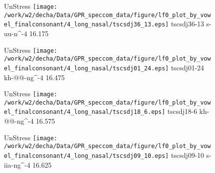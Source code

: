 \documentclass{article}
\begin{document}
\begin{figure}[t]
\begin{minipage}[b]{.24\textwidth}
UnStress
\centering
\texttt{[image: /work/w2/decha/Data/GPR\_speccom\_data/figure/lf0\_plot\_by\_vowel\_finalconsonant/4\_long\_nasal/tscsdj36\_13.eps]}
tscsdj36-13 s-uu-n\textasciicircum-4 16.175
\end{minipage}
\begin{minipage}[b]{.24\textwidth}
UnStress
\centering
\texttt{[image: /work/w2/decha/Data/GPR\_speccom\_data/figure/lf0\_plot\_by\_vowel\_finalconsonant/4\_long\_nasal/tscsdj01\_24.eps]}
tscsdj01-24 kh-@@-ng\textasciicircum-4 16.475
\end{minipage}
\begin{minipage}[b]{.24\textwidth}
UnStress
\centering
\texttt{[image: /work/w2/decha/Data/GPR\_speccom\_data/figure/lf0\_plot\_by\_vowel\_finalconsonant/4\_long\_nasal/tscsdj18\_6.eps]}
tscsdj18-6 kh-@@-ng\textasciicircum-4 16.575
\end{minipage}
\begin{minipage}[b]{.24\textwidth}
UnStress
\centering
\texttt{[image: /work/w2/decha/Data/GPR\_speccom\_data/figure/lf0\_plot\_by\_vowel\_finalconsonant/4\_long\_nasal/tscsdj09\_10.eps]}
tscsdj09-10 s-iia-ng\textasciicircum-4 16.625
\end{minipage}
\end{figure}
\end{document}
